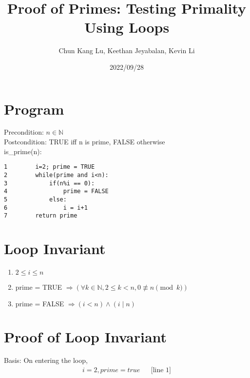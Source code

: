 \documentclass{article}
\title{Proof of Primes: Testing Primality Using Loops}
\author{Chun Kang Lu, Keethan Jeyabalan, Kevin Li}
\date{2022/09/28}
\begin{document}
	\maketitle
	\flushleft
	\section*{Program}
	Precondition: \(n\in \mathbb{N} \) \\ 
	Postcondition: TRUE iff n is prime, FALSE otherwise\\
	is\_prime(n): \\
	\begin{verbatim}
1        i=2; prime = TRUE
2        while(prime and i<n):
3            if(n%i == 0):
4                prime = FALSE
5            else:
6                i = i+1
7        return prime
	\end{verbatim}
	\section{Loop Invariant}
	\begin{enumerate}[label=(\alph*)]
		\item \(2 \leq i \leq n\)
		\item prime = TRUE \(\Longrightarrow(\forall k \in \mathbb{N}, 2 \leq k < n, 0 \not\equiv n \pmod k)\)
		\item prime = FALSE \(\Longrightarrow (i < n) \land (i\mid n)\)
	\end{enumerate}
	\section{Proof of Loop Invariant}
	Basis: On entering the loop,\\
	\begin{align*}
	i = 2, prime = true &&\text{[line 1]}\\
	\end{align*}
	
\end{document}
